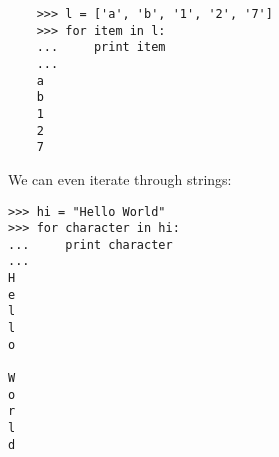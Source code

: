 \begin{lstlisting}
    >>> l = ['a', 'b', '1', '2', '7']
    >>> for item in l:
    ...     print item
    ...
    a
    b
    1
    2
    7
\end{lstlisting}

We can even iterate through strings:

\begin{lstlisting}
>>> hi = "Hello World"
>>> for character in hi:
...     print character
...
H
e
l
l
o

W
o
r
l
d
\end{lstlisting}
